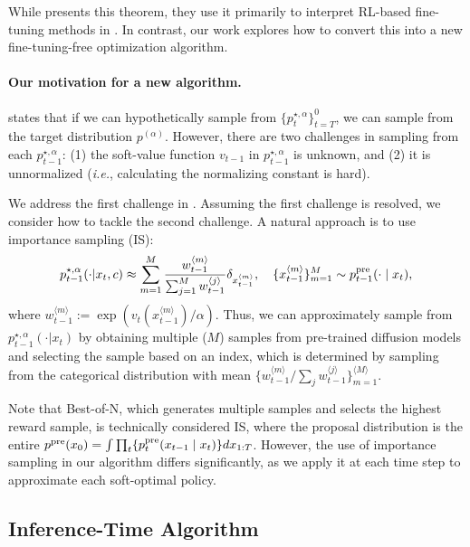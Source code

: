 While \citet{uehara2024bridging} presents this theorem, they use it primarily to interpret RL-based fine-tuning methods in \citet{fan2023dpok,black2023training}. In contrast, our work explores how to convert this into a new fine-tuning-free optimization algorithm. 

\vspace{-2mm}
\paragraph{Our motivation for a new algorithm.}  states that if we can hypothetically sample from $\{p^{\star,\alpha}_t\}_{t=T}^0$, we can sample from the target distribution $p^{(\alpha)}$. However, there are two challenges in sampling from each  $p^{\star,\alpha}_{t-1}$: (1) the soft-value function $v_{t-1}$ in $p^{\star,\alpha}_{t-1}$  is unknown, and (2) it is unnormalized (\textit{i.e.}, calculating the normalizing constant is hard). 

We address the first challenge in . Assuming the first challenge is resolved, we consider how to tackle the second challenge. A natural approach is to use importance sampling (IS):
\begin{align*}
 p^{\star,\alpha}_{t-1}(\cdot|x_t,c )\approx \sum_{m=1}^M \frac{w^{\langle m \rangle}_{t-1}}{\sum_{j=1}^M w^{\langle j \rangle}_{t-1}} \delta_{x^{\langle m \rangle}_{t-1}}, \quad \{x^{\langle m \rangle}_{t-1} \}_{m=1}^{M} \sim p^{\mathrm{pre}}_{t-1}(\cdot \mid x_t), 
\end{align*}
where $w^{\langle m \rangle}_{t-1}:= \exp(v_t(x^{\langle m \rangle}_{t-1})/\alpha)$. Thus, we can approximately sample from $p^{\star,\alpha}_{t-1}(\cdot|x_t)$ by obtaining multiple ($M$) samples from pre-trained diffusion models and selecting the sample based on an index, which is determined by sampling from the categorical distribution with mean $\{w^{\langle m \rangle}_{t-1}/\sum_j w^{\langle j\rangle}_{t-1}\}_{m=1}^{\langle M \rangle}$.

Note that Best-of-N, which generates multiple samples and selects the highest reward sample, is technically considered IS, where the proposal distribution is the entire $p^{\mathrm{pre}}(x_0)=\int \prod_t \{p^{\mathrm{pre}}_t(x_{t-1}\mid x_t)\}dx_{1:T}$. However, the use of importance sampling in our algorithm differs significantly, as we apply it at each time step to approximate each soft-optimal policy.


\vspace{-2mm}
\subsection{Inference-Time Algorithm}\label{sec:inference_time}
\vspace{-2mm}

